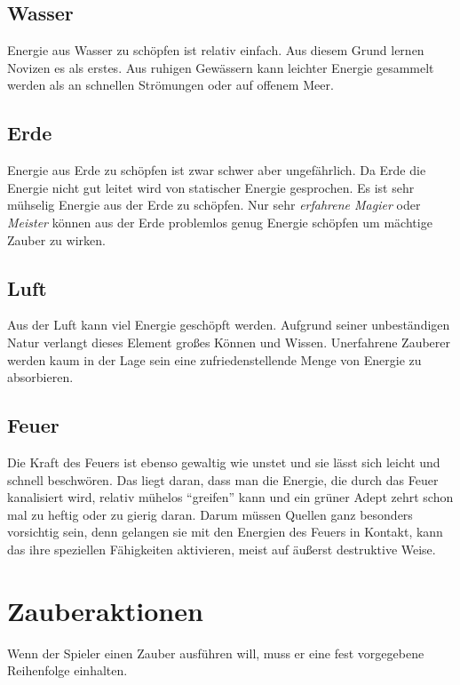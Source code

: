 \subsection{Wasser}
Energie aus Wasser zu schöpfen ist relativ einfach. Aus diesem Grund lernen Novizen es als erstes. Aus ruhigen Gewässern kann leichter Energie gesammelt werden als an schnellen Strömungen oder auf offenem Meer.

\subsection{Erde}
Energie aus Erde zu schöpfen ist zwar schwer aber ungefährlich. Da Erde die Energie nicht gut leitet wird von statischer Energie gesprochen. Es ist sehr mühselig Energie aus der Erde zu schöpfen. Nur sehr \textit{erfahrene Magier} oder \textit{Meister} können aus der Erde problemlos genug Energie schöpfen um mächtige Zauber zu wirken.

\subsection{Luft}
Aus der Luft kann viel Energie geschöpft werden. Aufgrund seiner unbeständigen Natur verlangt dieses Element großes Können und Wissen. Unerfahrene Zauberer werden kaum in der Lage sein eine zufriedenstellende Menge von Energie zu absorbieren.

\subsection{Feuer}
Die Kraft des Feuers ist ebenso gewaltig wie unstet und sie lässt sich leicht und schnell beschwören. Das liegt daran, dass man die Energie, die durch das Feuer kanalisiert wird, relativ mühelos "`greifen"' kann und ein grüner Adept zehrt schon mal zu heftig oder zu gierig daran. Darum müssen Quellen ganz besonders vorsichtig sein, denn gelangen sie mit den Energien des Feuers in Kontakt, kann das ihre speziellen Fähigkeiten aktivieren, meist auf äußerst destruktive Weise.


\section{Zauberaktionen}
Wenn der Spieler einen Zauber ausführen will, muss er eine fest vorgegebene Reihenfolge einhalten.

